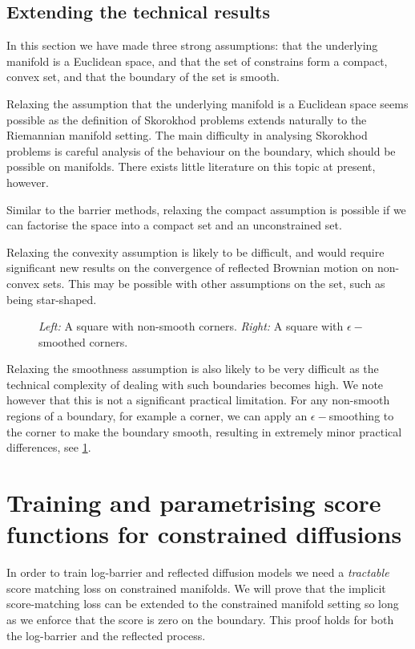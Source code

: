 \subsection{Extending the technical results}

In this section we have made three strong assumptions: that the underlying manifold is a Euclidean space, and that the set of constrains form a compact, convex set, and that the boundary of the set is smooth.

Relaxing the assumption that the underlying manifold is a Euclidean space seems possible as the definition of Skorokhod problems extends naturally to the Riemannian manifold setting.
The main difficulty in analysing Skorokhod problems is careful analysis of the behaviour on the boundary, which should be possible on manifolds.
There exists little literature on this topic at present, however.  

Similar to the barrier methods, relaxing the compact assumption is possible if we can factorise the space into a compact set and an unconstrained set.

Relaxing the convexity assumption is likely to be difficult, and would require significant new results on the convergence of reflected Brownian motion on non-convex sets.
This may be possible with other assumptions on the set, such as being star-shaped.

\begin{figure}[b]
	
	\caption{\emph{Left:} A square with non-smooth corners. \emph{Right:} A square with \(\epsilon-\)smoothed corners.}	
	\label{fig:epsilon_smooth}
\end{figure}


Relaxing the smoothness assumption is also likely to be very difficult as the technical complexity of dealing with such boundaries becomes high.
We note however that this is not a significant practical limitation.
For any non-smooth regions of a boundary, for example a corner, we can apply an \(\epsilon-\)smoothing to the corner to make the boundary smooth, resulting in extremely minor practical differences, see \cref{fig:epsilon_smooth}.



\section{Training and parametrising score functions for constrained diffusions}
\label{sec:score-netw-param}

In order to train log-barrier and reflected diffusion models we need a \emph{tractable} score matching loss on constrained manifolds.
We will prove that the implicit score-matching loss can be extended to the constrained manifold setting so long as we enforce that the score is zero on the boundary.
This proof holds for both the log-barrier and the reflected process.

